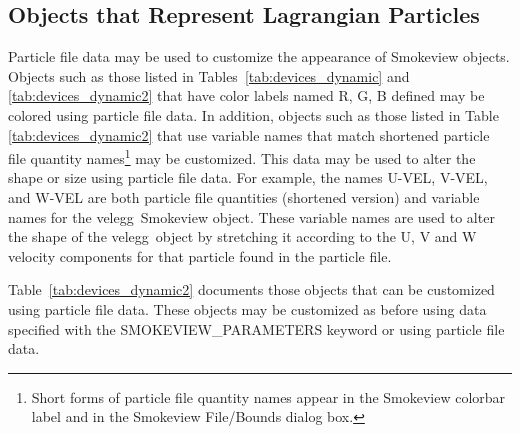 \subsection{Objects that Represent Lagrangian Particles}
\label{info:SMOKEVIEW_PART}

Particle file data may be used to customize the appearance of Smokeview objects. Objects such as those listed in Tables~\ref{tab:devices_dynamic} and \ref{tab:devices_dynamic2} that have color labels named {\ct R}, {\ct G}, {\ct B} defined may be colored using particle file data.  In addition, objects such as those listed in Table \ref{tab:devices_dynamic2} that use variable names that match shortened particle file quantity names\footnote{Short forms of particle file quantity names appear in the Smokeview colorbar label and in the Smokeview File/Bounds dialog box.} may be customized.  This data may be used to alter the shape or size using particle file data.  For example, the names {\ct U-VEL}, {\ct V-VEL}, and {\ct W-VEL} are both particle file quantities (shortened version) and variable names for the {\ct velegg}\ Smokeview object. These variable names are used to alter the shape of the {\ct velegg}\ object by stretching it according to the U, V and W velocity components for that particle found in the particle file.

Table~\ref{tab:devices_dynamic2} documents those objects that can be customized
using particle file data.  These objects may be customized as before using data specified with the {\ct SMOKEVIEW\_PARAMETERS}
keyword or using particle file data.

